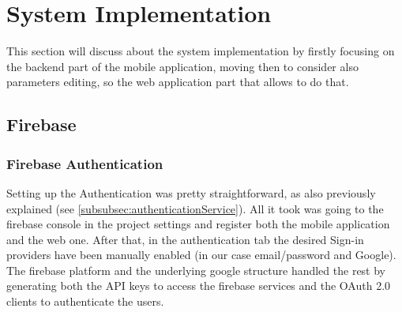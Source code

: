 \section{System Implementation}
This section will discuss about the system implementation by firstly focusing on the backend part of the mobile application, moving then to consider also parameters editing, so the web application part that allows to do that.
\subsection{Firebase}
\subsubsection{Firebase Authentication}
\label{subsubsec:firebaseAuthentication}
Setting up the Authentication was pretty straightforward, as also previously explained (see \cref{subsubsec:authenticationService}). All it took was going to the firebase console in the project settings and register both the mobile application and the web one. After that, in the authentication tab the desired Sign-in providers have been manually enabled (in our case email/password and Google). The firebase platform and the underlying google structure handled the rest by generating both the API keys to access the firebase services and the OAuth 2.0 clients to authenticate the users.


